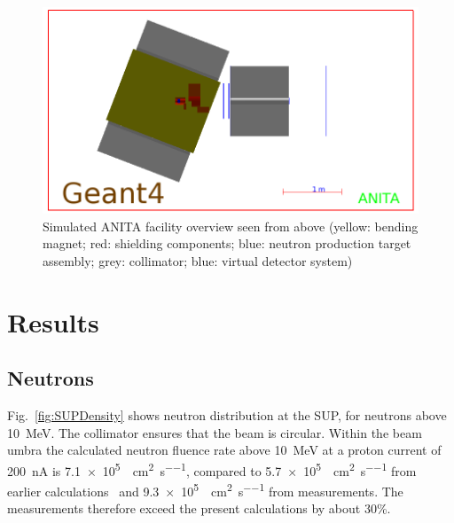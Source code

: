 \documentclass[peerreviewca,11pt,a4paper]{IEEEtran}
\let\MYoriglatexcaption\caption
\renewcommand{\caption}[2][\relax]{\MYoriglatexcaption[#2]{#2}}
\begin{document}
\begin{figure}[t]
	\centering
	\includegraphics[width=\columnwidth]{overview.png}
	\caption{
        Simulated ANITA facility overview seen from above (yellow: bending magnet; red: shielding components; blue: neutron production target assembly; grey: collimator; blue: virtual detector system)
    }
	\label{fig:ANITAoverview}
\end{figure}

\section{Results}

\subsection{Neutrons}
Fig.~\ref{fig:SUPDensity} shows neutron distribution at the SUP, for neutrons above \SI{10}{\MeV}.
The collimator ensures that the beam is circular. Within the beam umbra the calculated neutron fluence rate above \SI{10}{\MeV} at a proton current of \SI{200}{\nA} is \SI{7.1e5}{\neutron\per\cm\squared\per\second}, compared to \SI{5.7e5}{\neutron\per\cm\squared\per\second} from earlier calculations~\cite{Platt2013} and \SI{9.3e5}{\neutron\per\cm\squared\per\second} from measurements.
The measurements therefore exceed the present calculations by about 30\%.
\end{document}
